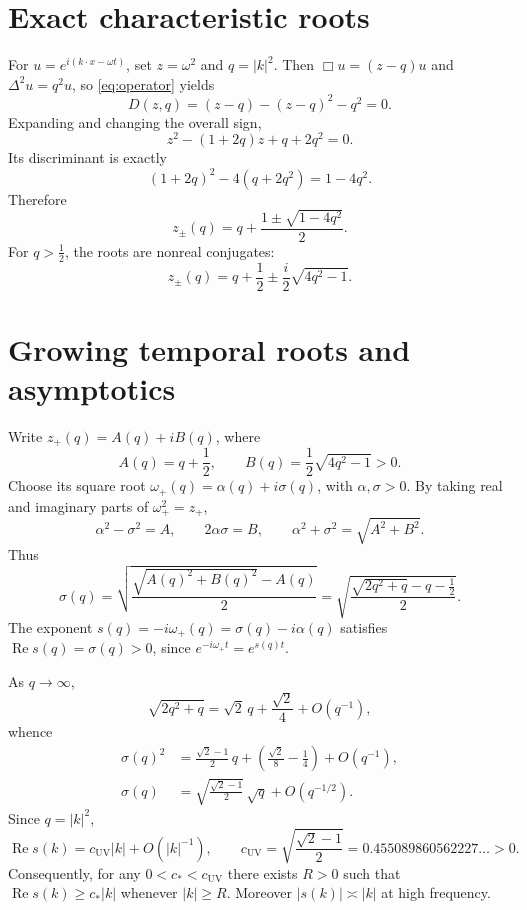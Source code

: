 \documentclass[11pt]{article}
\begin{document}
\section{Exact characteristic roots}

For \(u=e^{i(k\cdot x-\omega t)}\), set \(z=\omega^2\) and \(q=|k|^2\). Then \(\Box u=(z-q)u\) and \(\Delta^2u=q^2u\), so \eqref{eq:operator} yields
\begin{equation}\label{eq:dispersion}
  D(z,q)=(z-q)-(z-q)^2-q^2=0.
\end{equation}
Expanding and changing the overall sign,
\[
  z^2-(1+2q)z+q+2q^2=0.
\]
Its discriminant is exactly
\[
  (1+2q)^2-4(q+2q^2)=1-4q^2.
\]
Therefore
\begin{equation}\label{eq:zroots}
  z_\pm(q)=q+\frac{1\pm\sqrt{1-4q^2}}{2}.
\end{equation}
For \(q>\tfrac12\), the roots are nonreal conjugates:
\begin{equation}\label{eq:zcomplex}
  z_\pm(q)=q+\frac12\pm\frac{i}{2}\sqrt{4q^2-1}.
\end{equation}

\section{Growing temporal roots and asymptotics}

Write \(z_+(q)=A(q)+iB(q)\), where
\[
  A(q)=q+\frac12,
  \qquad B(q)=\frac12\sqrt{4q^2-1}>0.
\]
Choose its square root \(\omega_+(q)=\alpha(q)+i\sigma(q)\), with \(\alpha,\sigma>0\). By taking real and imaginary parts of \(\omega_+^2=z_+\),
\[
  \alpha^2-\sigma^2=A,
  \qquad 2\alpha\sigma=B,
  \qquad \alpha^2+\sigma^2=\sqrt{A^2+B^2}.
\]
Thus
\begin{equation}\label{eq:sigma-exact}
  \sigma(q)=\sqrt{\frac{\sqrt{A(q)^2+B(q)^2}-A(q)}{2}}
   =\sqrt{\frac{\sqrt{2q^2+q}-q-\tfrac12}{2}}.
\end{equation}
The exponent \(s(q)=-i\omega_+(q)=\sigma(q)-i\alpha(q)\) satisfies \(\operatorname{Re}s(q)=\sigma(q)>0\), since \(e^{-i\omega_+t}=e^{s(q)t}\).

As \(q\to\infty\),
\[
  \sqrt{2q^2+q}=\sqrt2\,q+\frac{\sqrt2}{4}+O(q^{-1}),
\]
whence
\begin{align}
  \sigma(q)^2
    &=\frac{\sqrt2-1}{2}\,q
       +\left(\frac{\sqrt2}{8}-\frac14\right)+O(q^{-1}),\\
  \sigma(q)
    &=\sqrt{\frac{\sqrt2-1}{2}}\,\sqrt q+O(q^{-1/2}).
\end{align}
Since \(q=|k|^2\),
\begin{equation}\label{eq:uv-growth}
  \boxed{\operatorname{Re}s(k)
  =c_{\mathrm{UV}}|k|+O(|k|^{-1}),\qquad
  c_{\mathrm{UV}}=\sqrt{\frac{\sqrt2-1}{2}}
      =0.455089860562227\ldots>0.}
\end{equation}
Consequently, for any \(0<c_*<c_{\mathrm{UV}}\) there exists \(R>0\) such that \(\operatorname{Re}s(k)\ge c_*|k|\) whenever \(|k|\ge R\). Moreover \(|s(k)|\asymp |k|\) at high frequency.
\end{document}
